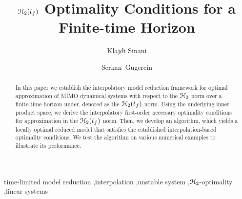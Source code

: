 \documentclass[preprint]{elsarticle}
\theoremstyle{definition}
\theoremstyle{definition}
\def\mathcal{\EuScript}
\numberwithin{equation}{section}
\newcommand{\FH}{FHIRKA}
\newcommand{\tf}{t_f}
\newcommand{\ch}{\mathcal{H}}
\begin{document}
\begin{frontmatter}

\title{ {$\ch_2(\tf)$ Optimality Conditions for a Finite-time Horizon}}

\author{Klajdi Sinani}

\author{Serkan~Gugercin}

\address{Department of Mathematics, Virginia Polytechnic Institute and State University, Blacksburg, VA 24061, USA}

\begin{abstract} %
In this paper we establish the interpolatory model reduction framework for optimal approximation of MIMO dynamical systems with respect to the $\ch_2$ norm over a finite-time horizon under, denoted as the $\ch_2(\tf)$ norm.
Using the underlying inner product space, we derive the interpolatory first-order necessary optimality conditions for approximation in the $\ch_2(\tf)$ norm. Then,  we  develop an algorithm, which yields a locally optimal reduced model that satisfies the established interpolation-based optimality conditions. We test the algorithm on various numerical examples to illustrate its performance.
  \end{abstract}

\begin{keyword}
	 time-limited model reduction \sep interpolation \sep unstable system \sep $\ch_2$-optimality \sep linear systems 
\end{keyword}

\end{frontmatter}
\end{document}
